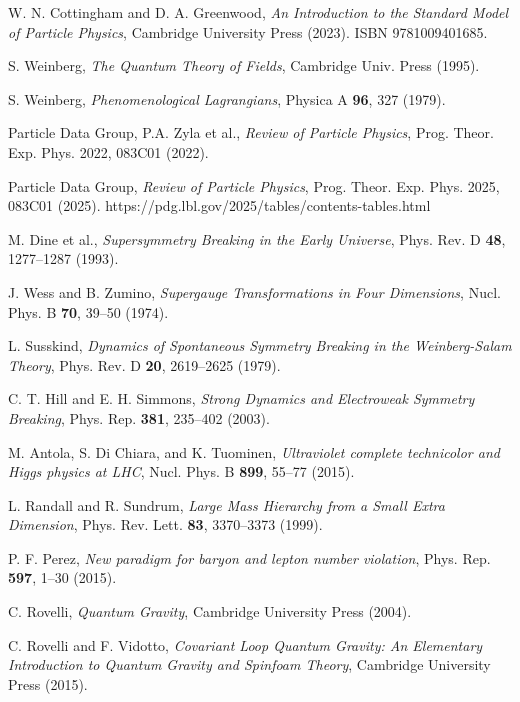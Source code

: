 \documentclass[%
amsmath,amssymb,
aps,
prb,
floatfix,showkeys
]{revtex4-2}
\begin{document}
\begin{thebibliography}{99}

W. N. Cottingham and D. A. Greenwood, {\it An Introduction to the Standard Model of Particle Physics},
Cambridge University Press (2023). ISBN 9781009401685.

S. Weinberg, {\it The Quantum Theory of Fields}, Cambridge Univ. Press (1995). 

S. Weinberg, {\it Phenomenological Lagrangians}, Physica A {\bf 96}, 327 (1979).

Particle Data Group, P.A. Zyla et al., {\it Review of Particle Physics},
Prog. Theor. Exp. Phys. 2022, 083C01 (2022).

Particle Data Group, {\it Review of Particle Physics}, 
Prog. Theor. Exp. Phys. 2025, 083C01 (2025). 
https://pdg.lbl.gov/2025/tables/contents-tables.html

M. Dine et al.,
{\it Supersymmetry Breaking in the Early Universe}, 
Phys. Rev. D {\bf 48}, 1277--1287 (1993).

J. Wess and B. Zumino, {\it Supergauge Transformations in Four Dimensions},
Nucl. Phys. B {\bf 70}, 39--50 (1974).

L. Susskind,
{\it Dynamics of Spontaneous Symmetry Breaking in the Weinberg-Salam Theory},
Phys. Rev. D {\bf 20}, 2619--2625 (1979).
  
C. T. Hill and E. H. Simmons,
{\it Strong Dynamics and Electroweak Symmetry Breaking}, 
Phys. Rep. {\bf 381}, 235--402 (2003).

M. Antola, S. Di Chiara, and K. Tuominen,
{\it Ultraviolet complete technicolor and Higgs physics at LHC},
Nucl. Phys. B {\bf 899}, 55--77 (2015).

L. Randall and R. Sundrum,
{\it Large Mass Hierarchy from a Small Extra Dimension}, 
Phys. Rev. Lett. {\bf 83}, 3370--3373 (1999).

P. F. Perez,
{\it New paradigm for baryon and lepton number violation},
Phys. Rep. {\bf 597}, 1--30 (2015).

C. Rovelli, {\it Quantum Gravity}, Cambridge University Press (2004).

C. Rovelli and F. Vidotto, {\it Covariant Loop Quantum Gravity: An Elementary Introduction to Quantum Gravity and Spinfoam Theory}, Cambridge University Press (2015).


\end{thebibliography}
\end{document}
